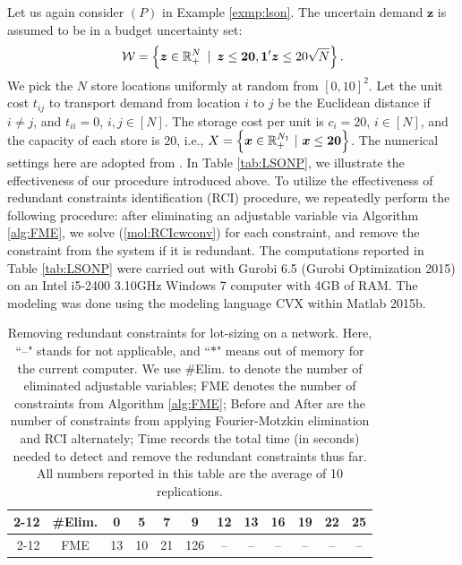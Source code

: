 \documentclass[fleqn,mnsc,blindrev]{informs4}
\newcommand{\mb}[1]{\mbox{\boldmath \ensuremath{#1}}}
\begin{document}
		\begin{example} \label{exp:rrc}
			Let us again consider $(P)$ in Example \ref{exmp:lson}. The uncertain demand $\boldsymbol{z}$ is assumed to be in a budget uncertainty set: 
\begin{equation}\label{set:bus}
				\mathcal{W}=\left\{ \boldsymbol{z} \in \mathbb{R}^{N}_+ \enskip| \enskip \boldsymbol{z} \le \boldsymbol{20}, \boldsymbol{1}'\boldsymbol{z} \le 20\sqrt{N} \right\}.
\end{equation}
			We pick the $N$ store locations uniformly at random from $[0,10]^2$. Let the unit cost $t_{ij}$ to transport demand from location $i$ to $j$ be the Euclidean distance if $i\ne j$, and $t_{ii}=0$, $i,j\in [N]$. The storage cost per unit is $c_i=20$, $i\in [N]$, and the capacity of each store is $20$, i.e., $X=\left\{ \mb{x} \in \mathbb{R}^{N_1}_+ \,\, |\,\,  \mb{x} \le \mb{20} \right\}$. The numerical settings here are adopted from \cite{bd16}. In Table \ref{tab:LSONP}, we illustrate the effectiveness of our procedure introduced above. To utilize the effectiveness of redundant constraints identification (RCI) procedure, we repeatedly perform the following procedure: after eliminating an adjustable variable via Algorithm \ref{alg:FME}, we solve (\ref{mol:RCIcwconv}) for each constraint, and remove the constraint from the system if it is redundant. The computations reported in Table \ref{tab:LSONP} were carried out with Gurobi 6.5 (Gurobi Optimization 2015) on an Intel i5-2400 3.10GHz Windows 7 computer with 4GB of RAM. The modeling was done using the modeling language CVX within Matlab 2015b.
\begin{table}[t]
\centering
\caption{Removing redundant constraints for lot-sizing on a network. Here, ``--" stands for not applicable, and ``$*$" means out of memory for the current computer. We use \#Elim. to denote the number of eliminated adjustable variables; FME denotes the number of constraints from Algorithm \ref{alg:FME}; Before and After are the number of constraints from applying Fourier-Motzkin elimination and RCI alternately; Time records the total time (in seconds) needed to detect and remove the redundant constraints thus far. All numbers reported in this table are the average of 10 replications.}
\def\arraystretch{1.3}\begin{tabular}{rc|cccccccccc}
\cline{2-12}
& \#Elim. & 0     & 5     & 7     & 9     & 12    &  13     & 16    & 19    & 22    & 25 \\ \cline{2-12}
& FME   & 13    & 10    & 21  & 126 & --     & --      &  --      &  --      &  --      &  --  \\  

\end{tabular}
\end{table}
\end{example}
\end{document}
